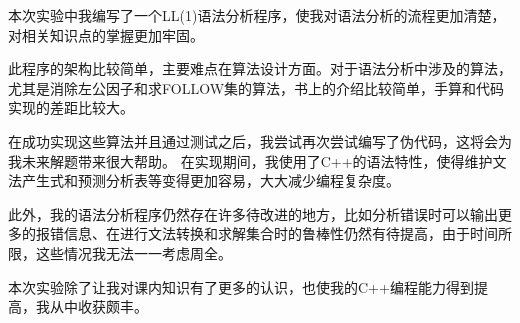 \documentclass[lang=cn,11pt,a4paper,cite=authornum]{paper}
\begin{document}
本次实验中我编写了一个LL(1)语法分析程序，使我对语法分析的流程更加清楚，对相关知识点的掌握更加牢固。

此程序的架构比较简单，主要难点在算法设计方面。对于语法分析中涉及的算法，尤其是消除左公因子和求FOLLOW集的算法，书上的介绍比较简单，手算和代码实现的差距比较大。

在成功实现这些算法并且通过测试之后，我尝试再次尝试编写了伪代码，这将会为我未来解题带来很大帮助。
在实现期间，我使用了C++的语法特性，使得维护文法产生式和预测分析表等变得更加容易，大大减少编程复杂度。

此外，我的语法分析程序仍然存在许多待改进的地方，比如分析错误时可以输出更多的报错信息、在进行文法转换和求解集合时的鲁棒性仍然有待提高，由于时间所限，这些情况我无法一一考虑周全。

本次实验除了让我对课内知识有了更多的认识，也使我的C++编程能力得到提高，我从中收获颇丰。
\end{document}
